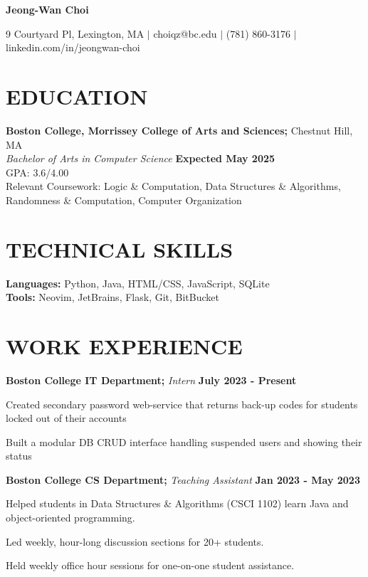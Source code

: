 \documentclass[11pt]{article}
\begin{document}
\begin{center}
\textbf{\LARGE Jeong-Wan Choi}
\end{center}

\begin{center}
9 Courtyard Pl, Lexington, MA $|$ choiqz@bc.edu $|$ (781) 860-3176 $|$ linkedin.com/in/jeongwan-choi 
\end{center}

\section*{EDUCATION}
\textbf{Boston College, Morrissey College of Arts and Sciences;} Chestnut Hill, MA \\
\textit{Bachelor of Arts in Computer Science} \hfill \textbf{Expected May 2025} \\
GPA: 3.6/4.00 \\
Relevant Coursework: Logic \& Computation, Data Structures \& Algorithms, Randomness \& Computation, Computer Organization

\section*{TECHNICAL SKILLS}
\textbf{Languages:} Python, Java, HTML/CSS, JavaScript, SQLite \\
\textbf{Tools:} Neovim, JetBrains, Flask, Git, BitBucket 

\section*{WORK EXPERIENCE}
\textbf{Boston College IT Department;} \textit{Intern} \hfill \textbf{July 2023 - Present}
\begin{sublist}
	\item Created secondary password web-service that returns back-up codes for students locked out of their accounts 
	\item Built a modular DB CRUD interface handling suspended users and showing their status 
\end{sublist}

\raggedright
\textbf{Boston College CS Department;} \textit{Teaching Assistant} \hfill \textbf{Jan 2023 - May 2023}
\begin{sublist}
	\item Helped students in Data Structures \& Algorithms (CSCI 1102) learn Java and object-oriented programming. 
	\item Led weekly, hour-long discussion sections for 20+ students. 
	\item Held weekly office hour sessions for one-on-one student assistance.
\end{sublist}
\end{document}
